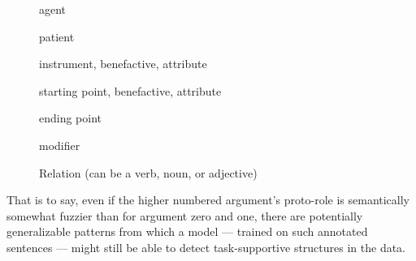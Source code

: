 \begin{description}
  \item[] agent
  \item[] patient
  \item[] instrument, benefactive, attribute
  \item[] starting point, benefactive, attribute
  \item[] ending point
  \item[] modifier
  \item[] Relation (can be a verb, noun, or adjective)
\end{description}

That is to say, even if the higher numbered argument's proto-role is semantically somewhat
fuzzier than for argument zero and one, there are potentially generalizable patterns from
which a model --- trained on such annotated sentences --- might still be able to detect
task-supportive structures in the data.




